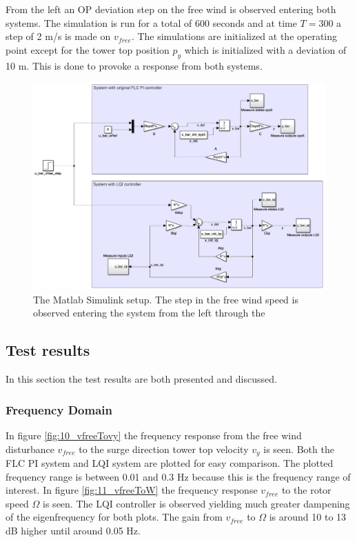 From the left an OP deviation step on the free wind is observed entering both systems. The simulation is run for a total of 600 seconds and at time $ T = 300 $ a step of 2 m/s is made on $ v_{free} $. The simulations are initialized at the operating point except for the tower top position $ p_y $ which is initialized with a deviation of 10 m. This is done to provoke a response from both systems.
\begin{figure}[ht]
	\centering
	\includegraphics[width=0.95\linewidth]{Graphics/TestResults/linearModPerf/simulink_setup.png}
	\caption{The Matlab Simulink setup. The step in the free wind speed is observed entering the system from the left through the }
	\label{fig:simulink_setup}
\end{figure}


\subsection{Test results}
In this section the test results are both presented and discussed.


\subsubsection{Frequency Domain}
In figure \cref{fig:10_vfreeTovy} the frequency response from the free wind disturbance $ v_{free} $ to the surge direction tower top velocity $ v_y $ is seen. Both the FLC PI system and LQI system are plotted for easy comparison. The plotted frequency range is between 0.01 and 0.3 Hz because this is the frequency range of interest. In figure \cref{fig:11_vfreeToW} the frequency response $ v_{free} $ to the rotor speed $ \Omega $ is seen. The LQI controller is observed yielding much greater dampening of the eigenfrequency for both plots. The gain from $ v_{free} $ to $ \Omega $ is around 10 to 13 dB higher until around 0.05 Hz. 

